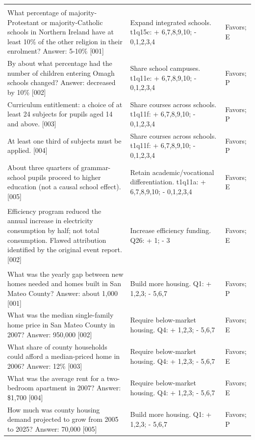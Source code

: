 \begin{longtable}{>{\raggedright\arraybackslash}p{8cm}>{\raggedright\arraybackslash}p{4cm}>{\raggedright\arraybackslash}p{2cm}}
\addlinespace
\multicolumn{3}{l}{\textbf{Northern Ireland: schools (2007)}} \\*
What percentage of majority-Protestant or majority-Catholic schools in Northern Ireland have at least 10\% of the other religion in their enrolment? Answer: 5-10\% [001] & Expand integrated schools. t1q15c: + 6,7,8,9,10; - 0,1,2,3,4 & Favors; E \\
By about what percentage had the number of children entering Omagh schools changed? Answer: decreased by 10\% [002] & Share school campuses. t1q11e: + 6,7,8,9,10; - 0,1,2,3,4 & Favors; P \\
Curriculum entitlement: a choice of at least 24 subjects for pupils aged 14 and above. [003] & Share courses across schools. t1q11f: + 6,7,8,9,10; - 0,1,2,3,4 & Favors; P \\
At least one third of subjects must be applied. [004] & Share courses across schools. t1q11f: + 6,7,8,9,10; - 0,1,2,3,4 & Favors; P \\
About three quarters of grammar-school pupils proceed to higher education (not a causal school effect). [005] & Retain academic/vocational differentiation. t1q11a: + 6,7,8,9,10; - 0,1,2,3,4 & Favors; E \\
\addlinespace
\multicolumn{3}{l}{\textbf{Vermont: energy (2007)}} \\*
Efficiency program reduced the annual increase in electricity consumption by half; not total consumption. Flawed attribution identified by the original event report. [002] & Increase efficiency funding. Q26: + 1; - 3 & Favors; E \\
\addlinespace
\multicolumn{3}{l}{\textbf{San Mateo: housing (2008)}} \\*
What was the yearly gap between new homes needed and homes built in San Mateo County? Answer: about 1,000 [001] & Build more housing. Q1: + 1,2,3; - 5,6,7 & Favors; P \\
What was the median single-family home price in San Mateo County in 2007? Answer: 950,000 [002] & Require below-market housing. Q4: + 1,2,3; - 5,6,7 & Favors; E \\
What share of county households could afford a median-priced home in 2006? Answer: 12\% [003] & Require below-market housing. Q4: + 1,2,3; - 5,6,7 & Favors; E \\
What was the average rent for a two-bedroom apartment in 2007? Answer: \$1,700 [004] & Require below-market housing. Q4: + 1,2,3; - 5,6,7 & Favors; E \\
How much was county housing demand projected to grow from 2005 to 2025? Answer: 70,000 [005] & Build more housing. Q1: + 1,2,3; - 5,6,7 & Favors; P \\

\end{longtable}
